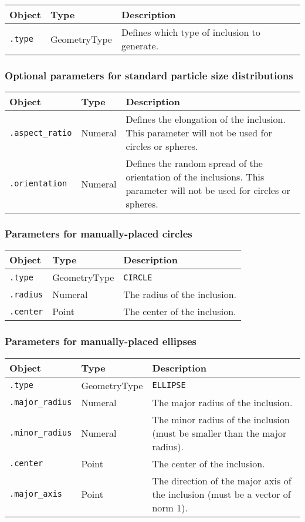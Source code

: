 \documentclass[10pt]{article}
\begin{document}
\begin{tabularx}{\textwidth}{llX}
\hline 
Object & Type & Description \\ 
\hline 
\verb+.type+ & GeometryType & Defines which type of inclusion to generate. \\ 
\hline 
\end{tabularx}

\subsubsection*{Optional parameters for standard particle size distributions}

\begin{tabularx}{\textwidth}{llX}
\hline 
Object & Type & Description \\ 
\hline 
\verb+.aspect_ratio+ & Numeral & Defines the elongation of the inclusion. This parameter will not be used for circles or spheres. \\ 
\verb+.orientation+ & Numeral & Defines the random spread of the orientation of the inclusions. This parameter will not be used for circles or spheres. \\ 
\hline 
\end{tabularx}

\subsubsection*{Parameters for manually-placed circles}

\begin{tabularx}{\textwidth}{llX}
\hline 
Object & Type & Description \\ 
\hline 
\verb+.type+ & GeometryType & \verb+CIRCLE+ \\
\verb+.radius+ & Numeral & The radius of the inclusion. \\ 
\verb+.center+ & Point & The center of the inclusion. \\ 
\hline 
\end{tabularx}

\subsubsection*{Parameters for manually-placed ellipses}

\begin{tabularx}{\textwidth}{llX}
\hline 
Object & Type & Description \\ 
\hline 
\verb+.type+ & GeometryType & \verb+ELLIPSE+ \\
\verb+.major_radius+ & Numeral & The major radius of the inclusion. \\ 
\verb+.minor_radius+ & Numeral & The minor radius of the inclusion (must be smaller than the major radius). \\ 
\verb+.center+ & Point & The center of the inclusion. \\ 
\verb+.major_axis+ & Point & The direction of the major axis of the inclusion (must be a vector of norm 1).\\
\hline 
\end{tabularx}
\end{document}
